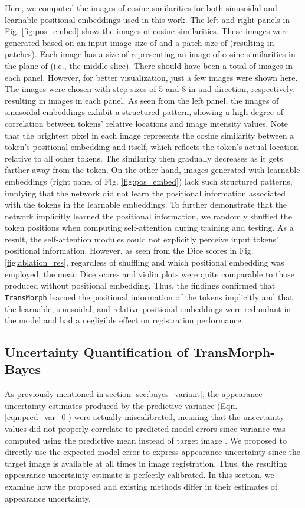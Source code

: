 \documentclass[times,twocolumn,final]{elsarticle}
\begin{document}
Here, we computed the images of cosine similarities for both sinusoidal and learnable positional embeddings used in this work. The left and right panels in Fig. \ref{fig:pos_embed} show the images of cosine similarities. These images were generated based on an input image size of  and a patch size of  (resulting in  patches). Each image has a size of  representing an image of cosine similarities in the plane of  (i.e., the middle slice). There should have been a total of  images in each panel. However, for better visualization, just a few images were shown here. The images were chosen with step sizes of 5 and 8 in  and  direction, respectively, resulting in  images in each panel. As seen from the left panel, the images of sinusoidal embeddings exhibit a structured pattern, showing a high degree of correlation between tokens' relative locations and image intensity values. Note that the brightest pixel in each image represents the cosine similarity between a token's positional embedding and itself, which reflects the token's actual location relative to all other tokens. The similarity then gradually decreases as it gets farther away from the token. On the other hand, images generated with learnable embeddings (right panel of Fig. \ref{fig:pos_embed}) lack such structured patterns, implying that the network did not learn the positional information associated with the tokens in the learnable embeddings. To further demonstrate that the network implicitly learned the positional information, we randomly shuffled the token positions when computing self-attention during training and testing. As a result, the self-attention modules could not explicitly perceive input tokens' positional information. However, as seen from the Dice scores in Fig. \ref{fig:ablation_res}, regardless of shuffling and which positional embedding was employed, the mean Dice scores and violin plots were quite comparable to those produced without positional embedding. Thus, the findings confirmed that \texttt{TransMorph} learned the positional information of the tokens implicitly and that the learnable, sinusoidal, and relative positional embeddings were redundant in the model and had a negligible effect on registration performance.

\subsection{Uncertainty Quantification of TransMorph-Bayes}
As previously mentioned in section \ref{sec:bayes_variant}, the appearance uncertainty estimates produced by the predictive variance (Eqn. \ref{eqn:pred_var_0}) were actually miscalibrated, meaning that the uncertainty values did not properly correlate to predicted model errors since variance was computed using the predictive mean instead of target image . We proposed to directly use the expected model error to express appearance uncertainty since the target image is available at all times in image registration. Thus, the resulting appearance uncertainty estimate is perfectly calibrated. In this section, we examine how the proposed and existing methods differ in their estimates of appearance uncertainty.
\end{document}
